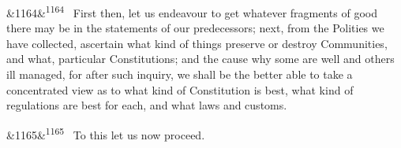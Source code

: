 \documentclass[12pt]{article}
\newcommand{\para}[1][]{\par\noindent\ifx&#1&\else\textsuperscript{\footnotesize #1}~\fi}
\begin{document}
\para[1164] First then, let us endeavour to get whatever fragments of good there may be in the statements of our predecessors; next, from the Polities we have collected, ascertain what kind of things preserve or destroy Communities, and what, particular Constitutions; and the cause why some are well and others ill managed, for after such inquiry, we shall be the better able to take a concentrated view as to what kind of Constitution is best, what kind of regulations are best for each, and what laws and customs.

\para[1165] To this let us now proceed.
\end{document}
